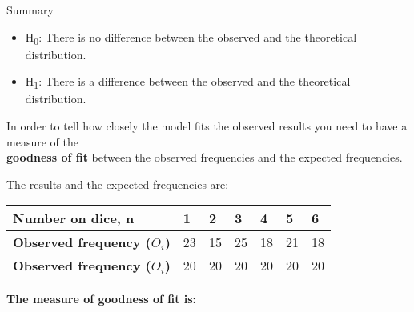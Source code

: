 \documentclass[fleqn]{article}
\begin{document}
\begin{mybox2}[colbacktitle=WildStrawberry]{Summary}
    \begin{itemize}
        \bfseries
        \item H\textsubscript{0}: There is no difference between the observed and the theoretical distribution.
        \item H\textsubscript{1}: There is a difference between the observed and the theoretical distribution.
    \end{itemize}
    
    In order to tell how closely the model fits the observed results you need to have a measure of the \\\textbf{goodness of fit} between the observed frequencies and the expected frequencies.
    
    The results and the expected frequencies are:
    
    \begin{center}\vspace{-2mm}
    \begin{minipage}[t]{0.8\linewidth}
        \begin{tabularx}{\textwidth}{|X|*6{P{11mm}|}}
            \hline
            \textbf{Number on dice, n}          & 1  & 2  & 3  & 4  & 5  & 6        \\\hline
            \textbf{Observed frequency ($O_i$)} & 23 & 15 & 25 & 18 & 21 & 18       \\\hline
            \textbf{Observed frequency ($O_i$)} & 20 & 20 & 20 & 20 & 20 & 20       \\\hline
        \end{tabularx}
        \vspace{4mm}
    \end{minipage}
    \end{center}
    
    
    \textbf{The measure of goodness of fit is:}
    
\end{mybox2}
\end{document}
